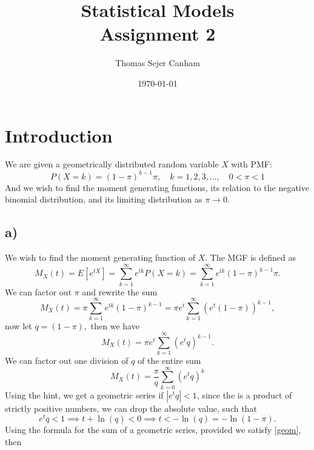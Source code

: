 \documentclass{article}
\title{Statistical Models\\Assignment 2}
\author{Thomas Sejer Canham}
\date{\today}
\theoremstyle{definition}
\theoremstyle{remark}
\begin{document}
\maketitle

\section*{Introduction}
We are given a geometrically distributed random variable $X$ with PMF:
 \begin{equation}
    P(X = k) = (1 - \pi)^{k - 1} \pi, \quad k = 1, 2, 3, \ldots, \quad 0 < \pi < 1
 \end{equation}
 And we wish to find the moment generating functions, its relation to the negative binomial distribution, and its limiting distribution as $\pi \to 0$.

\subsection*{a)}
We wish to find the moment generating function  of $X$. The MGF is defined as
\begin{equation}
    M_X(t) = E[e^{tX}] = \sum_{k=1}^{\infty} e^{tk} P(X=k) = \sum_{k=1}^{\infty} e^{tk} (1 - \pi)^{k - 1} \pi.
\end{equation}
We can factor out $\pi$ and rewrite the sum
\begin{equation}
    M_X(t) = \pi \sum_{k=1}^{\infty} e^{tk} (1 - \pi)^{k - 1} = \pi e^t \sum_{k=1}^{\infty} (e^t (1 - \pi))^{k - 1},
\end{equation}
now let $q = (1-\pi),$ then we have
\begin{equation}
    M_X(t) = \pi e^t \sum_{k=1}^{\infty} (e^t q)^{k - 1}.
\end{equation}
We can factor out one division of $q$ of the entire sum
\begin{equation}
    M_X(t) = \dfrac{\pi}{q} \sum_{k=0}^{\infty} (e^t q)^{k}
\end{equation}
Using the hint, we get a geometric series if $|e^t q| < 1$, since the is a product of strictly positive numbers, we can drop the absolute value, such that
\begin{equation}
    e^t q < 1 \implies t + \ln(q) < 0 \implies t < -\ln(q) = -\ln(1-\pi). \label{geom}
\end{equation}
Using the formula for the sum of a geometric series, provided we satisfy \eqref{geom}, then
\end{document}
